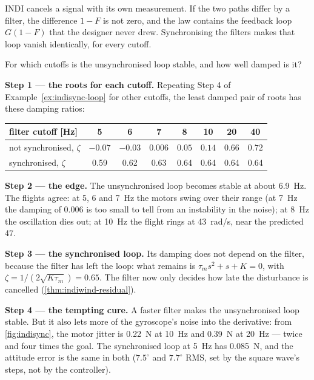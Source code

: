 \begin{keyidea}
INDI cancels a signal with its own measurement. If the two paths differ by a filter, the difference $1 - F$ is not zero, and the law contains the feedback loop $G(1 - F)$ that the designer never drew. Synchronising the filters makes that loop vanish identically, for every cutoff.
\end{keyidea}

\begin{example}
\label{ex:indisync-edge}
For which cutoffs is the unsynchronised loop stable, and how well damped is it?

\textbf{Step 1 — the roots for each cutoff.} Repeating Step 4 of Example~\ref{ex:indisync-loop} for other cutoffs, the least damped pair of roots has these damping ratios:

\begin{center}\small\sffamily
\begin{tabular}{lccccccc}
\toprule
filter cutoff [\si{Hz}] & 5 & 6 & 7 & 8 & 10 & 20 & 40\\
\midrule
not synchronised, $\zeta$ & $-0.07$ & $-0.03$ & $0.006$ & $0.05$ & $0.14$ & $0.66$ & $0.72$\\
synchronised, $\zeta$ & 0.59 & 0.62 & 0.63 & 0.64 & 0.64 & 0.64 & 0.64\\
\bottomrule
\end{tabular}
\end{center}

\textbf{Step 2 — the edge.} The unsynchronised loop becomes stable at about \SI{6.9}{Hz}. The flights agree: at 5, 6 and \SI{7}{Hz} the motors swing over their range (at \SI{7}{Hz} the damping of 0.006 is too small to tell from an instability in the noise); at \SI{8}{Hz} the oscillation dies out; at \SI{10}{Hz} the flight rings at \SI{43}{rad/s}, near the predicted 47.

\textbf{Step 3 — the synchronised loop.} Its damping does not depend on the filter, because the filter has left the loop: what remains is $\tau_m s^2 + s + K = 0$, with $\zeta = 1/(2\sqrt{K\tau_m}) = 0.65$. The filter now only decides how late the disturbance is cancelled (\cref{thm:indiwind-residual}).

\textbf{Step 4 — the tempting cure.} A faster filter makes the unsynchronised loop stable. But it also lets more of the gyroscope's noise into the derivative: from \cref{fig:indisync}, the motor jitter is \SI{0.22}{N} at \SI{10}{Hz} and \SI{0.39}{N} at \SI{20}{Hz} — twice and four times the goal. The synchronised loop at \SI{5}{Hz} has \SI{0.085}{N}, and the attitude error is the same in both ($7.5^\circ$ and $7.7^\circ$ RMS, set by the square wave's steps, not by the controller).
\end{example}

